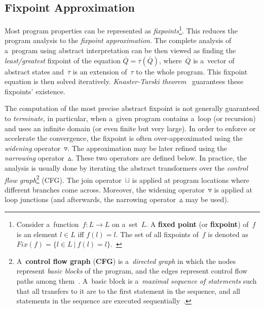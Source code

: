 \subsection{Fixpoint Approximation~\cite{AILatticeModelCousot, wideningNarrowingCousot, savAI, staticAnalysisMoller, programAnalysisNielson, staticAnalysisRival}}
\label{sec:AIFixpoints}

Most program properties can be represented as \emph{fixpoints}\footnote{Consider a~function~$ f : L \rightarrow L $ on a~set~$ L $. A \textbf{fixed point} (or \textbf{fixpoint}) of~$ f $ is an element $ l \in L $ iff $ f(l) = l $. The set of all fixpoints of~$ f $ is denoted as $ Fix(f) = \{l \in L\ |\ f(l) = l\} $.~\cite{programAnalysisNielson}}. This reduces the program analysis to the \emph{fixpoint approximation}. The complete analysis of a~program using abstract interpretation can be then viewed as finding the \emph{least/greatest} fixpoint of the equation $ \overline{Q} = \overline{\tau}(\overline{Q}) $, where~$ \overline{Q} $ is a~vector of abstract states and~$ \overline{\tau} $ is an extension of~$ \tau $ to the whole program. This fixpoint equation is then solved iteratively. \emph{Knaster-Tarski theorem}~\cite{tarski} guarantees these fixpoints' existence.

The computation of the most precise abstract fixpoint is not generally guaranteed to \emph{terminate}, in particular, when a~given program contains a~loop (or recursion) and uses an infinite domain (or even finite but very large). In order to enforce or accelerate the convergence, the fixpoint is often over-approximated using the \emph{widening} operator~$ \triangledown $. The approximation may be later refined using the \emph{narrowing} operator~$ \vartriangle $. These two operators are defined below. In practice, the analysis is usually done by iterating the abstract transformers over the \emph{control flow graph}\footnote{A~\textbf{control flow graph} (\textbf{CFG}) is a~\emph{directed graph} in which the nodes represent \emph{basic blocks} of the program, and the edges represent control flow paths among them~\cite{controlFlowAnalysisAllen}. A~basic block is a~\emph{maximal sequence of statements} such that all transfers to it are to the first statement in the sequence, and all statements in the sequence are executed sequentially~\cite{programAnalysisNielson}.} (CFG). The join operator~$ \sqcup $ is applied at program locations where different branches come across. Moreover, the widening operator~$ \triangledown $ is applied at loop junctions (and afterwards, the narrowing operator~$ \vartriangle $ may be used).

